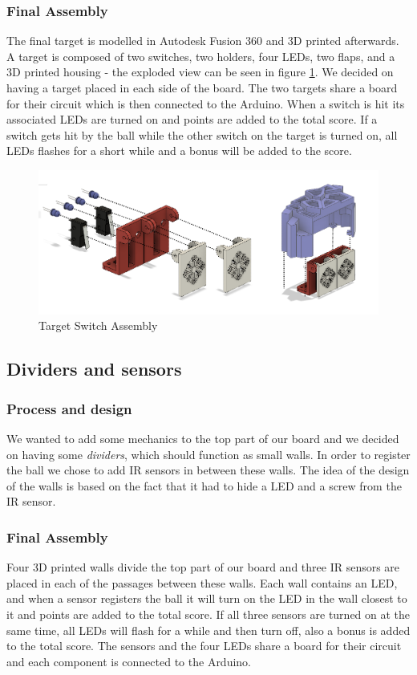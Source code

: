 \subsubsection{Final Assembly}
The final target is modelled in Autodesk Fusion 360 and 3D printed afterwards. A target is composed of two switches, two holders, four LEDs, two flaps, and a 3D printed housing - the exploded view can be seen in figure \ref{fig:switchassembly}. We decided on having a target placed in each side of the board. The two targets share a board for their circuit which is then connected to the Arduino. When a switch is hit its associated LEDs are turned on and points are added to the total score. If a switch gets hit by the ball while the other switch on the target is turned on, all LEDs flashes for a short while and a bonus will be added to the score. 
\begin{figure}
	\centering
	\includegraphics[width=\textwidth]{img/SwitchAssembly.png}
	\caption{Target Switch Assembly}
	\label{fig:switchassembly}
\end{figure}

\subsection{Dividers and sensors}
\subsubsection{Process and design}
We wanted to add some mechanics to the top part of our board and we decided on having some \textit{dividers}, which should function as small walls. In order to register the ball we chose to add IR sensors in between these walls. The idea of the design of the walls is based on the fact that it had to hide a LED and a screw from the IR sensor.  

\subsubsection{Final Assembly}
Four 3D printed walls divide the top part of our board and three IR sensors are placed in each of the passages between these walls. Each wall contains an LED, and when a sensor registers the ball it will turn on the LED in the wall closest to it and points are added to the total score. If all three sensors are turned on at the same time, all LEDs will flash for a while and then turn off, also a bonus is added to the total score.
The sensors and the four LEDs share a board for their circuit and each component is connected to the Arduino. 

